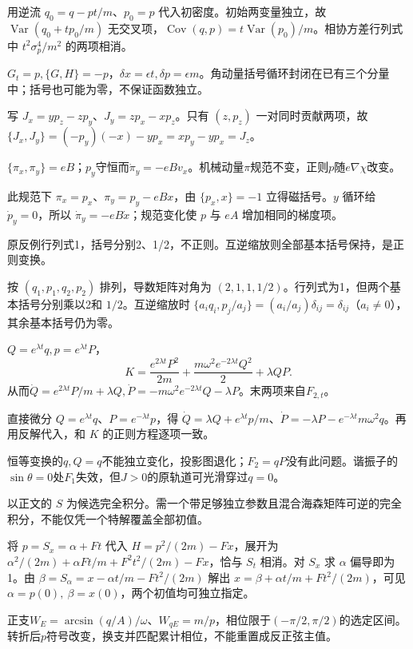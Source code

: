 \begin{bookexercises}
用逆流 $q_0=q-pt/m$、$p_0=p$ 代入初密度。初始两变量独立，故 $\operatorname{Var}(q_0+tp_0/m)$ 无交叉项，$\operatorname{Cov}(q,p)=t\operatorname{Var}(p_0)/m$。相协方差行列式中 $t^2\sigma_p^4/m^2$ 的两项相消。
\item $G_t=p,\{G,H\}=-p$，$\delta x=\epsilon t,\delta p=\epsilon m$。角动量括号循环封闭在已有三个分量中；括号也可能为零，不保证函数独立。

写 $J_x=yp_z-zp_y$、$J_y=zp_x-xp_z$。只有 $(z,p_z)$ 一对同时贡献两项，故 $\{J_x,J_y\}=(-p_y)(-x)-y p_x=xp_y-yp_x=J_z$。
\item $\{\pi_x,\pi_y\}=eB$；$p_y$守恒而$\dot\pi_y=-eBv_x$。机械动量$\pi$规范不变，正则$p$随$e\nabla\chi$改变。

此规范下 $\pi_x=p_x$、$\pi_y=p_y-eBx$，由 $\{p_x,x\}=-1$ 立得磁括号。$y$ 循环给 $\dot p_y=0$，所以 $\dot\pi_y=-eB\dot x$；规范变化使 $p$ 与 $eA$ 增加相同的梯度项。
\item 原反例行列式1，括号分别2、1/2，不正则。互逆缩放则全部基本括号保持，是正则变换。

按 $(q_1,p_1,q_2,p_2)$ 排列，导数矩阵对角为 $(2,1,1,1/2)$。行列式为1，但两个基本括号分别乘以2和 $1/2$。互逆缩放时 $\{a_i q_i,p_j/a_j\}=(a_i/a_j)\delta_{ij}=\delta_{ij}$（$a_i\ne0$），其余基本括号仍为零。
\item $Q=e^{\lambda t}q,p=e^{\lambda t}P$，
\[K=\frac{e^{2\lambda t}P^2}{2m}+\frac{m\omega^2e^{-2\lambda t}Q^2}{2}+\lambda QP.\]
从而$\dot Q=e^{2\lambda t}P/m+\lambda Q,\dot P=-m\omega^2e^{-2\lambda t}Q-\lambda P$。末两项来自$F_{2,t}$。

直接微分 $Q=e^{\lambda t}q$、$P=e^{-\lambda t}p$，得 $\dot Q=\lambda Q+e^{\lambda t}p/m$、$\dot P=-\lambda P-e^{-\lambda t}m\omega^2q$。再用反解代入，和 $K$ 的正则方程逐项一致。
\item 恒等变换的$q,Q=q$不能独立变化，投影图退化；$F_2=qP$没有此问题。谐振子的$\sin\theta=0$处$F_1$失效，但$J>0$的原轨道可光滑穿过$q=0$。
\item 以正文的 $S$ 为候选完全积分。需一个带足够独立参数且混合海森矩阵可逆的完全积分，不能仅凭一个特解覆盖全部初值。

将 $p=S_x=\alpha+Ft$ 代入 $H=p^2/(2m)-Fx$，展开为 $\alpha^2/(2m)+\alpha Ft/m+F^2t^2/(2m)-Fx$，恰与 $S_t$ 相消。对 $S_x$ 求 $\alpha$ 偏导即为1。由 $\beta=S_\alpha=x-\alpha t/m-Ft^2/(2m)$ 解出 $x=\beta+\alpha t/m+Ft^2/(2m)$，可见 $\alpha=p(0),\ \beta=x(0)$，两个初值均可独立指定。
\item 正支$W_E=\arcsin(q/A)/\omega$、$W_{qE}=m/p$，相位限于$(-\pi/2,\pi/2)$的选定区间。转折后$p$符号改变，换支并匹配累计相位，不能重置成反正弦主值。


\end{bookexercises}
